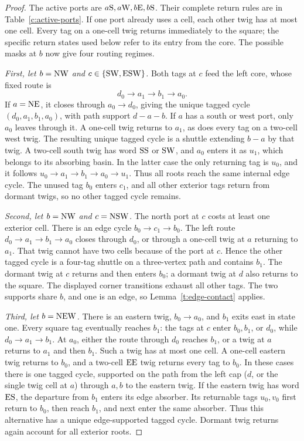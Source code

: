 \begin{proof}
The active ports are \(a\mathrm{S},a\mathrm{W},b\mathrm{E},b\mathrm{S}\). Their complete
return rules are in Table~\ref{c:active-ports}. If one port already uses a
cell, each other twig has at most one cell. Every tag on a one-cell twig
returns immediately to the square; the specific return states used below
refer to its entry from the core. The possible masks at \(b\) now give
four routing regimes.

\emph{First, let \(b=\mathrm{N}\mathrm{W}\) and
\(c\in\{\mathrm{S}\mathrm{W},\mathrm{E}\mathrm{S}\mathrm{W}\}\).}
Both tags at \(c\) feed the left core, whose fixed route is
\[
d_0\longrightarrow a_1\longrightarrow b_1\longrightarrow a_0.
\]
If \(a=\mathrm{N}\mathrm{E}\), it closes through \(a_0\to d_0\), giving the unique
tagged cycle \((d_0,a_1,b_1,a_0)\), with path support \(d-a-b\).
If \(a\) has a south or west port, only \(a_0\) leaves through it.
A one-cell twig returns to \(a_1\), as does every tag on a two-cell west
twig. The resulting unique tagged cycle is a shuttle extending \(b-a\)
by that twig. A two-cell south twig has word \(\mathrm{S}\mathrm{S}\) or
\(\mathrm{S}\mathrm{W}\), and \(a_0\) enters it as \(u_1\), which belongs to
its absorbing basin. In the latter case the only returning tag is
\(u_0\), and it follows
\(u_0\to a_1\to b_1\to a_0\to u_1\).
Thus all roots reach the same internal edge cycle. The unused tag
\(b_0\) enters \(c_1\), and all other exterior tags return from dormant
twigs, so no other tagged cycle remains.

\emph{Second, let \(b=\mathrm{N}\mathrm{W}\) and \(c=\mathrm{N}\mathrm{S}\mathrm{W}\).}
The north port at \(c\) costs at least one exterior cell. There is an edge
cycle \(b_0\to c_1\to b_0\). The left route
\(d_0\to a_1\to b_1\to a_0\) closes through \(d_0\), or through
a one-cell twig at \(a\) returning to \(a_1\). That twig cannot have
two cells because of the port at \(c\). Hence the other tagged cycle is a
four-tag shuttle on a three-vertex path and contains \(b_1\). The
dormant twig at \(c\) returns and then enters \(b_0\); a dormant twig at
\(d\) also returns to the square. The displayed corner transitions
exhaust all other tags. The two supports share \(b\), and one is an edge,
so Lemma~\ref{t:edge-contact} applies.

\emph{Third, let \(b=\mathrm{N}\mathrm{E}\mathrm{W}\).}
There is an eastern twig, \(b_0\to a_0\), and \(b_1\) exits east in
state one. Every square tag eventually reaches \(b_1\): the tags at
\(c\) enter \(b_0,b_1\), or \(d_0\), while \(d_0\to a_1\to b_1\).
At \(a_0\), either the route through \(d_0\) reaches \(b_1\), or a
twig at \(a\) returns to \(a_1\) and then \(b_1\). Such a twig has
at most one cell. A one-cell eastern twig returns to \(b_0\), and a
two-cell \(\mathrm{E}\mathrm{E}\) twig returns every tag to \(b_0\). In these cases
there is one tagged cycle, supported on the path from the left cap
(\(d\), or the single twig cell at \(a\)) through \(a,b\) to the
eastern twig. If the eastern twig has word \(\mathrm{E}\mathrm{S}\), the departure
from \(b_1\) enters its edge absorber. Its returnable tags \(u_0,v_0\)
first return to \(b_0\), then reach \(b_1\), and next enter the same
absorber. Thus this alternative has a unique edge-supported tagged cycle.
Dormant twig returns again account for all exterior roots.


\end{proof}
